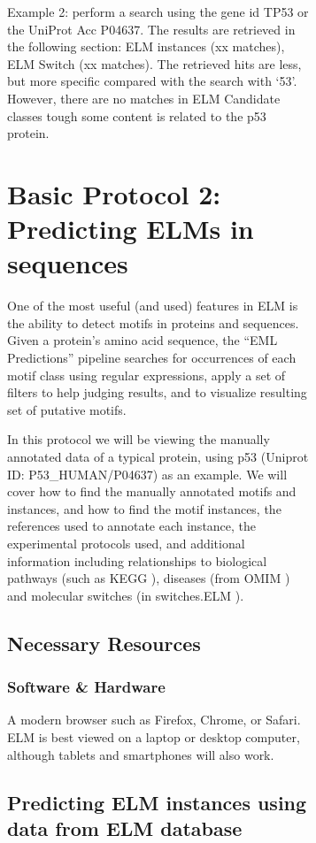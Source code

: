 {\begin{figure}[h!]
{{\begin{figure}[h!]
{{Example 2: perform a search using the gene id TP53 or the UniProt Acc
P04637. The results are retrieved in the following section: ELM
instances (xx matches), ELM Switch (xx matches). The retrieved hits are
less, but more specific compared with the search with `53'. However,
there are no matches in ELM Candidate classes tough some content is
related to the p53 protein.

\section{Basic Protocol 2: Predicting ELMs in
sequences}\label{basic-protocol-2-predicting-elms-in-sequences}

One of the most useful (and used) features in ELM is the ability to
detect motifs in proteins and sequences. Given a protein's amino acid
sequence, the ``EML Predictions'' pipeline searches for occurrences of
each motif class using regular expressions, apply a set of filters to
help judging results, and to visualize resulting set of putative motifs.

In this protocol we will be viewing the manually annotated data of a
typical protein, using p53 (Uniprot ID: P53\_HUMAN/P04637) as an
example. We will cover how to find the manually annotated motifs and
instances, and how to find the motif instances, the references used to
annotate each instance, the experimental protocols used, and additional
information including relationships to biological pathways (such as KEGG
\cite{26476454}), diseases (from OMIM \cite{17357067}) and molecular
switches (in switches.ELM \cite{23550212}).

\subsection{Necessary Resources}\label{necessary-resources}

\subsubsection{Software \& Hardware}\label{software-hardware}

A modern browser such as Firefox, Chrome, or Safari. ELM is best viewed
on a laptop or desktop computer, although tablets and smartphones will
also work.

\subsection{Predicting ELM instances using data from ELM
database}\label{predicting-elm-instances-using-data-from-elm-database}

}}
\end{figure}}}
\end{figure}}
